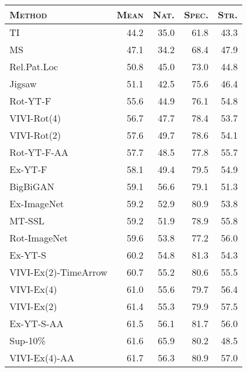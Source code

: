 \documentclass[10pt,twocolumn,letterpaper]{article}
\begin{document}
\begin{table*}[h!]
    \centering
    \small
    \begin{tabular}{lrrrr}
\toprule
\textsc{Method}  &     \textsc{Mean} & \textsc{Nat.} & \textsc{Spec.} & \textsc{Str.} \\
\midrule
TI                      &     44.2 &     35.0 &        61.8 &       43.3 \\
MS                      &     47.1 &     34.2 &        68.4 &       47.9 \\
Rel.Pat.Loc             &     50.8 &     45.0 &        73.0 &       44.8 \\
Jigsaw                  &     51.1 &     42.5 &        75.6 &       46.4 \\
Rot-YT-F                &     55.6 &     44.9 &        76.1 &       54.8 \\
VIVI-Rot(4)             &     56.7 &     47.7 &        78.4 &       53.7 \\
VIVI-Rot(2)             &     57.6 &     49.7 &        78.6 &       54.1 \\
Rot-YT-F-AA             &     57.7 &     48.5 &        77.8 &       55.7 \\
Ex-YT-F                 &     58.1 &     49.4 &        79.5 &       54.9 \\
BigBiGAN                &     59.1 &     56.6 &        79.1 &       51.3 \\
Ex-ImageNet             &     59.2 &     52.9 &        80.9 &       53.8 \\
MT-SSL                  &     59.2 &     51.9 &        78.9 &       55.8 \\
Rot-ImageNet            &     59.6 &     53.8 &        77.2 &       56.0 \\
Ex-YT-S                 &     60.2 &     54.8 &        81.3 &       54.3 \\
VIVI-Ex(2)-TimeArrow    &     60.7 &     55.2 &        80.6 &       55.5 \\
VIVI-Ex(4)              &     61.0 &     55.6 &        79.7 &       56.4 \\
VIVI-Ex(2)              &     61.4 &     55.3 &        79.9 &       57.5 \\
Ex-YT-S-AA              &     61.5 &     56.1 &        81.7 &       56.0 \\
Sup-10\%                 &     61.6 &     65.9 &        80.2 &       48.5 \\
VIVI-Ex(4)-AA           &     61.7 &     56.3 &        80.9 &       57.0 \\

\end{tabular}
\end{table*}
\end{document}
